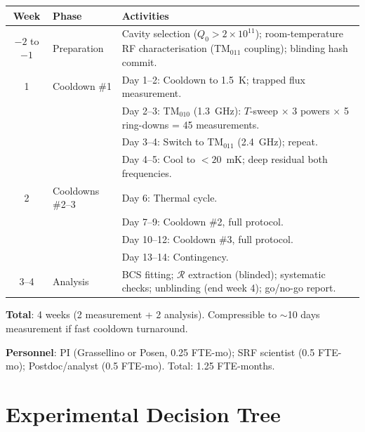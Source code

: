 \documentclass[11pt]{article}
\newcommand{\ee}[1]{\times 10^{#1}}
\newcommand{\Rq}{\mathcal{R}}
\begin{document}
\begin{center}
\renewcommand{\arraystretch}{1.3}
\begin{tabular}{@{}clp{8cm}@{}}
\toprule
\textbf{Week} & \textbf{Phase} & \textbf{Activities} \\
\midrule
$-2$ to $-1$ & Preparation &
  Cavity selection ($Q_0 > 2\ee{11}$); room-temperature RF
  characterisation (TM$_{011}$ coupling); blinding hash commit. \\
\midrule
1 & Cooldown \#1 &
  Day 1--2: Cooldown to 1.5~K; trapped flux measurement. \\
  & & Day 2--3: TM$_{010}$ (1.3~GHz): $T$-sweep
  $\times$ 3 powers $\times$ 5 ring-downs = 45 measurements. \\
  & & Day 3--4: Switch to TM$_{011}$ (2.4~GHz); repeat. \\
  & & Day 4--5: Cool to $<20$~mK; deep residual both frequencies. \\
\midrule
2 & Cooldowns \#2--3 &
  Day 6: Thermal cycle. \\
  & & Day 7--9: Cooldown \#2, full protocol. \\
  & & Day 10--12: Cooldown \#3, full protocol. \\
  & & Day 13--14: Contingency. \\
\midrule
3--4 & Analysis &
  BCS fitting; $\Rq$ extraction (blinded); systematic checks;
  unblinding (end week 4); go/no-go report. \\
\bottomrule
\end{tabular}
\end{center}

\textbf{Total}: 4 weeks (2 measurement + 2 analysis).
Compressible to $\sim$10 days measurement if fast cooldown turnaround.

\textbf{Personnel}: PI (Grassellino or Posen, 0.25 FTE-mo); SRF
scientist (0.5 FTE-mo); Postdoc/analyst (0.5 FTE-mo). Total:
1.25 FTE-months.


\part{Experimental Decision Tree}
\label{part:decision}

\end{document}
